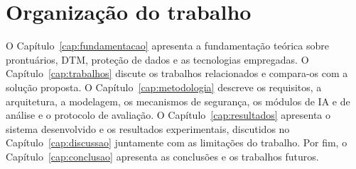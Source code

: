 \section{Organização do trabalho}

O Capítulo~\ref{cap:fundamentacao} apresenta a fundamentação teórica sobre prontuários, DTM, proteção de dados e as tecnologias empregadas. O Capítulo~\ref{cap:trabalhos} discute os trabalhos relacionados e compara-os com a solução proposta. O Capítulo~\ref{cap:metodologia} descreve os requisitos, a arquitetura, a modelagem, os mecanismos de segurança, os módulos de IA e de análise e o protocolo de avaliação. O Capítulo~\ref{cap:resultados} apresenta o sistema desenvolvido e os resultados experimentais, discutidos no Capítulo~\ref{cap:discussao} juntamente com as limitações do trabalho. Por fim, o Capítulo~\ref{cap:conclusao} apresenta as conclusões e os trabalhos futuros.

